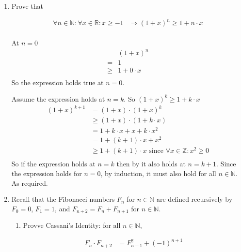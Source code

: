 \documentclass[10pt,\jkfside,a4paper]{article}
\begin{document}
\begin{enumerate}
\begin{enumerate}
\end{enumerate}

\item Prove that

\begin{equation}
\begin{split}
\forall n \in \mathbb{N}: \forall x \in \mathbb{R}: x \geq -1 &\Longrightarrow (1 + x)^n \geq 1 + n \cdot x\\
\end{split}
\end{equation}

At $n = 0$
\begin{equation}
\begin{split}
 & (1 + x)^n\\
=& 1\\
\geq& 1 + 0\cdot x\\
\end{split}
\end{equation}
So the expression holds true at $n = 0$.

Assume the expression holds at $n = k$. So $(1 + x)^k \geq 1 + k \cdot x$
\begin{equation}
\begin{split}
(1 + x)^{k + 1} &= (1 + x) \cdot (1 + x)^k\\
				&\geq (1 + x)  \cdot ( 1 + k\cdot x)\\
				&= 1 + k\cdot x + x + k\cdot x^2\\
				&= 1 + (k + 1)\cdot x + x^2\\
				&\geq 1 + (k + 1)\cdot x\text{ since }\forall x \in \mathbb{Z}: x^2\geq 0\\
\end{split}
\end{equation}
So if the expression holds at $n = k$ then by it also holds at $n = k + 1$.
Since the expression holds for $n = 0$, by induction, it must also hold 
for all $n \in \mathbb{N}$. As required.

\item Recall that the Fibonacci numbers $F_n$ for $n \in \mathbb{N}$ are defined recursively by 
$F_0 = 0$, $F_1 = 1$, and $F_{n+2}=F_n + F_{n+1}$ for $n \in \mathbb{N}$.

\begin{enumerate}

\item Provve Cassani's Identity: for all $n \in \mathbb{N}$,

\begin{equation}
\begin{split}
F_n \cdot F_{n + 2} &= F_{n + 1}^2 + (-1)^{n + 1}\\
\end{split}
\end{equation}


\end{enumerate}
\end{enumerate}
\end{document}
